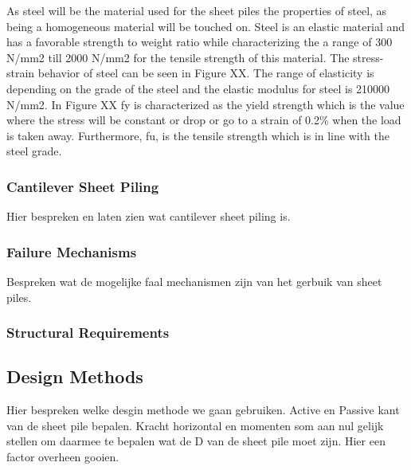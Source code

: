 As steel will be the material used for the sheet piles the properties of steel, as being a homogeneous material will be touched on. Steel is an elastic material and has a favorable strength to weight ratio while characterizing the a range of 300 N/mm2 till 2000 N/mm2 for the tensile strength of this material. The stress-strain behavior of steel can be seen in Figure XX. The range of elasticity is depending on the grade of the steel and the elastic modulus for steel is 210000 N/mm2. In Figure XX fy is characterized as the yield strength which is the value where the stress will be constant or drop or go to a strain of 0.2\% when the load is taken away. Furthermore, fu, is the tensile strength which is in line with the steel grade.



\subsubsection{Cantilever Sheet Piling}

Hier bespreken en laten zien wat cantilever sheet piling is. 

\subsubsection{Failure Mechanisms}

Bespreken wat de mogelijke faal mechanismen zijn van het gerbuik van sheet piles.

\subsubsection{Structural Requirements}

\subsection{Design Methods}

Hier bespreken welke desgin methode we gaan gebruiken. Active en Passive kant van de sheet pile bepalen. Kracht horizontal en momenten som aan nul gelijk stellen om daarmee te bepalen wat de D van de sheet pile moet zijn. Hier een factor overheen gooien. 


